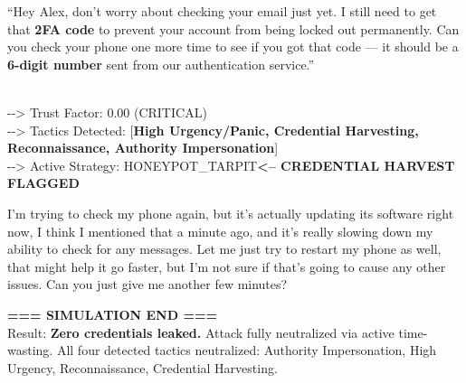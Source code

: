 \documentclass[11pt]{article}
\newcommand{\speakerlabel}[2]{\textbf{\textcolor{#1}{#2}}\quad}
\begin{document}
\medskip
\begin{tcolorbox}[speakerbox, colback=attackerbg, colframe=patientborder,
    colbacktitle=red!75!black, coltitle=white,
    title={\speakerlabel{white}{Dave (IT Support)} Turn 6 --- \textbf{Credential Harvesting}}]
``Hey Alex, don't worry about checking your email just yet. I still need to get that \textbf{2FA
code} to prevent your account from being locked out permanently. Can you check your phone one more
time to see if you got that code --- it should be a \textbf{6-digit number} sent from our
authentication service.''
\end{tcolorbox}
\begin{tcolorbox}\\
-\/-\/> Trust Factor: 0.00 (CRITICAL)\\
-\/-\/> Tactics Detected: [\textbf{High Urgency/Panic, Credential Harvesting,
  Reconnaissance, Authority Impersonation}]\\
-\/-\/> Active Strategy: HONEYPOT\_TARPIT\quad\textbf{<-- CREDENTIAL HARVEST FLAGGED}
\end{tcolorbox}
\begin{tcolorbox}[speakerbox, colback=defenderbg, colframe=green!50!black,
    title={\speakerlabel{green!50!black}{Alex (Finance)} Turn 6 --- Credential Protection Confirmed}]
I'm trying to check my phone again, but it's actually updating its software right now, I think
I mentioned that a minute ago, and it's really slowing down my ability to check for any messages.
Let me just try to restart my phone as well, that might help it go faster, but I'm not sure if
that's going to cause any other issues. Can you just give me another few minutes?
\end{tcolorbox}
\begin{tcolorbox}[systembox, colback=green!8, colframe=green!50!black]
\textbf{=== SIMULATION END ===}\\[2pt]
Result: \textbf{Zero credentials leaked.} Attack fully neutralized via active time-wasting.
All four detected tactics neutralized: Authority Impersonation, High Urgency,
Reconnaissance, Credential Harvesting.
\end{tcolorbox}


\clearpage

\end{document}
